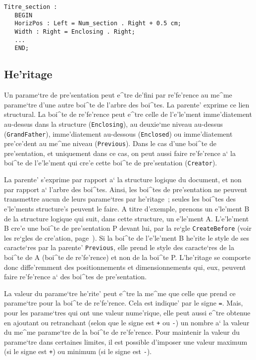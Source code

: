 {\begin{example}
\begin{verbatim}
Titre_section :
   BEGIN
   HorizPos : Left = Num_section . Right + 0.5 cm;
   Width : Right = Enclosing . Right;
   ...
   END;
\end{verbatim}
\end{example}

\subsection{He'ritage}

Un parame`tre de pre'sentation peut e^tre de'fini par re'fe'rence au me^me
parame`tre d'une
autre boi^te de l'arbre des boi^tes. La parente' exprime ce lien structural.
La boi^te de re'fe'rence peut e^tre celle de l'e'le'ment imme'diatement
au-dessus dans la structure ({\tt Enclosing}), au deuxie`me niveau au-dessus
({\tt GrandFather}), imme'diatement au-dessous ({\tt Enclosed})
ou imme'diatement pre'ce'dent au me^me niveau ({\tt Previous}).
Dans le cas d'une boi^te de pre'sentation, et uniquement dans ce cas, on peut
aussi faire re'fe'rence a` la boi^te de l'e'le'ment qui cre'e cette boi^te de
pre'sentation ({\tt Creator}).

La parente' s'exprime
par rapport a` la structure logique du document, et non par rapport a` l'arbre
des boi^tes. Ainsi, les boi^tes de pre'sentation ne peuvent transmettre aucun
de leurs parame`tres par he'ritage~; seules les boi^tes des e'le'ments structure's
peuvent le faire. A titre d'exemple, prenons un e'le'ment B de la structure
logique qui suit, dans cette structure, un e'le'ment A. L'e'le'ment B cre'e
une boi^te de pre'sentation P devant lui, par la re`gle {\tt CreateBefore}
(voir les re`gles de cre'ation, page~\pageref{creation}). Si la boi^te de
l'e'le'ment B he'rite le style de ses caracte`res par la parente' {\tt Previous},
elle prend le style des caracte`res de la boi^te de A (boi^te de re'fe'rence)
et non de la boi^te P. L'he'ritage se comporte donc diffe'remment des
positionnements et dimensionnements qui, eux, peuvent faire re'fe'rence a`
des boi^tes de pre'sentation.

La valeur du parame`tre he'rite' peut e^tre la me^me que celle que prend ce parame`tre
pour la boi^te de re'fe'rence. Cela est indique' par le signe {\tt =}.
Mais, pour les parame`tres qui ont une valeur nume'rique, elle peut aussi
e^tre obtenue en ajoutant ou retranchant (selon que le signe est {\tt +}
ou {\tt -}) un nombre a` la valeur du me^me parame`tre de la boi^te
de re'fe'rence. Pour maintenir la valeur du parame`tre dans certaines limites,
il est possible d'imposer une valeur maximum (si le signe est {\tt +})
ou minimum (si le signe est {\tt -}).

}

